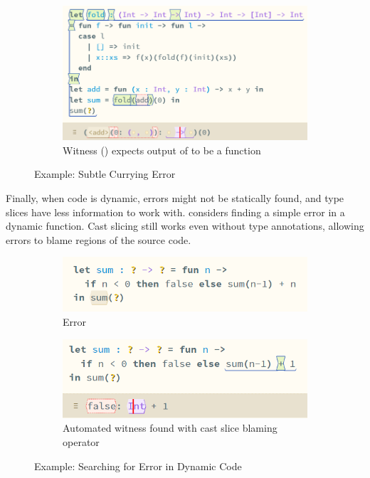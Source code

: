 \begin{figure}[h]
\begin{subfigure}{0.49\textwidth}
\end{subfigure}
\begin{subfigure}{0.49\textwidth}
\includegraphics[width=1\textwidth]{Media/Figures/curries_expects_function}
\caption{Witness (\code{[0]}) expects output of  to be a function}
\end{subfigure}
\caption{Example: Subtle Currying Error}
\label{fig:TastyCurry}
\end{figure}

Finally, when code is dynamic, errors might not be statically found, and type slices have less information to work with.  considers finding a simple error in a dynamic function. Cast slicing still works even without type annotations, allowing errors to blame regions of the source code.
\begin{figure}[h]
\centering
\begin{subfigure}{0.45\textwidth}
\includegraphics[width=1\textwidth]{Media/Figures/dynamic_code_error}
\caption{Error}
\end{subfigure}
\begin{subfigure}{0.45\textwidth}
\includegraphics[width=1\textwidth]{Media/Figures/dynamic_code_error_cast_slice}
\caption{Automated witness found with cast slice blaming \code{+} operator}
\end{subfigure}
\caption{Example: Searching for Error in Dynamic Code}
\label{fig:DynamicExample}
\end{figure}


